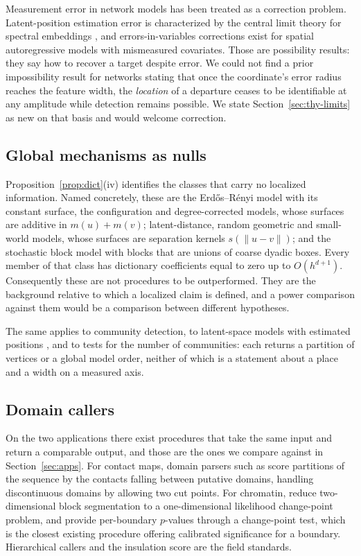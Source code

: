 \documentclass[11pt]{article}
\theoremstyle{definition}
\newcommand{\1}{\mathbf 1}\newcommand{\op}{\operatorname}
\begin{document}
Measurement error in network models has been treated as a correction problem.
Latent-position estimation error is characterized by the central limit theory
for spectral embeddings \citep{rubindelanchy2022,athreya2018}, and
errors-in-variables corrections exist for spatial autoregressive models with
mismeasured covariates.  Those are possibility results: they say how to
recover a target despite error.  We could not find a prior impossibility
result for networks stating that once the coordinate's error radius reaches
the feature width, the \emph{location} of a departure ceases to be identifiable
at any amplitude while detection remains possible.  We state
Section~\ref{sec:thy-limits} as new on that basis and would welcome correction.

\subsection{Global mechanisms as nulls}

Proposition~\ref{prop:dict}(iv) identifies the classes that carry no localized
information.  Named concretely, these are the Erd\H os--R\'enyi model with its
constant surface, the configuration and degree-corrected models, whose
surfaces are additive in $m(u)+m(v)$; latent-distance, random geometric and
small-world models, whose surfaces are separation kernels $s(\|u-v\|)$; and
the stochastic block model with blocks that are unions of coarse dyadic boxes.
Every member of that class has dictionary coefficients equal to zero up to
$O(h^{d+1})$.  Consequently these are not procedures to be outperformed.  They
are the background relative to which a localized claim is defined, and a power
comparison against them would be a comparison between different hypotheses.

The same applies to community detection, to latent-space models with estimated
positions \citep{hoff2002}, and to tests for the number of communities: each
returns a partition of vertices or a global model order, neither of which is a
statement about a place and a width on a measured axis.

\subsection{Domain callers}

On the two applications there exist procedures that take the same input and
return a comparable output, and those are the ones we compare against in
Section~\ref{sec:apps}.  For contact maps, domain parsers such as
\citet{zheng2020} score partitions of the sequence by the contacts falling
between putative domains, handling discontinuous domains by allowing two cut
points.  For chromatin, \citet{levyleduc2014} reduce two-dimensional block
segmentation to a one-dimensional likelihood change-point problem, and
\citet{xing2021} provide per-boundary $p$-values through a change-point test,
which is the closest existing procedure offering calibrated significance for a
boundary.  Hierarchical callers and the insulation score are the field
standards.
\end{document}
